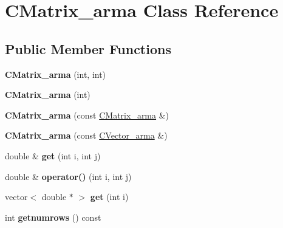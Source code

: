 \hypertarget{class_c_matrix__arma}{}\section{C\+Matrix\+\_\+arma Class Reference}
\label{class_c_matrix__arma}
\subsection*{Public Member Functions}
\begin{DoxyCompactItemize}
\item 
\mbox{\label{class_c_matrix__arma_a634eb6637055aa40746cd5c355243f00}} 
{\bfseries C\+Matrix\+\_\+arma} (int, int)
\item 
\mbox{\label{class_c_matrix__arma_a2ea25583fff63865f75cf1f4c083cf54}} 
{\bfseries C\+Matrix\+\_\+arma} (int)
\item 
\mbox{\label{class_c_matrix__arma_a9fa4b0bd33fca791e8f4d6f75e1c701b}} 
{\bfseries C\+Matrix\+\_\+arma} (const \hyperlink{class_c_matrix__arma}{C\+Matrix\+\_\+arma} \&)
\item 
\mbox{\label{class_c_matrix__arma_aa0f195a23275400d71a37b1cb3f294dd}} 
{\bfseries C\+Matrix\+\_\+arma} (const \hyperlink{class_c_vector__arma}{C\+Vector\+\_\+arma} \&)
\item 
\mbox{\label{class_c_matrix__arma_a1c622889b3d3d63a9c181dfd9dde1523}} 
double \& {\bfseries get} (int i, int j)
\item 
\mbox{\label{class_c_matrix__arma_a2ce1ab5471a9121d58cc774729fa7e3e}} 
double \& {\bfseries operator()} (int i, int j)
\item 
\mbox{\label{class_c_matrix__arma_abcebe6064c6d2eaf759c4b8af6dd402e}} 
vector$<$ double $\ast$ $>$ {\bfseries get} (int i)
\item 
\mbox{\label{class_c_matrix__arma_afc9e5e2c31f766068e575596bdcc58c2}} 
int {\bfseries getnumrows} () const
\item 
\mbox{\label{class_c_matrix__arma_a3cd89477fe0bbae1c85475c1018895e9}} 

\end{DoxyCompactItemize}
